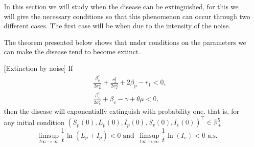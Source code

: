 
In this section we will study when the disease can be extinguished, for this we will give the necessary conditions so that this phenomenon can occur through two different cases. The first case will be when due to the intensity of the noise.

The theorem presented below shows that under conditions on the parameters we can make the disease tend to become extinct.

\begin{theorem}\label{theorem_noise}[Extinction by noise]
	If
	\begin{align*}
		&\frac{\beta_p^2}{2\sigma_L^2}
		+\frac{r_2^2}{2\sigma_I^2}+2\beta_p-r_1<0,\\
		&\frac{\beta_v^2}{2\sigma_v^2}+\beta_v-\gamma+\theta\mu<0,
	\end{align*}		
	 then the disease will exponentially extinguish with probability one. that is, for any initial condition $(S_p(0),L_p(0),I_p(0),S_v(0),I_v(0))^\top\in \mathbb{R}_+^5$
	\begin{equation*}
		\limsup_{t\infty \rightarrow \infty}\frac{1}{t}\ln(L_p+I_p)< 0\,\, \mbox{and}\,\,\, \limsup_{t\infty \rightarrow \infty}\frac{1}{t}\ln(I_v)< 0\,\,\mbox{a.s.}
	\end{equation*}
\end{theorem}
